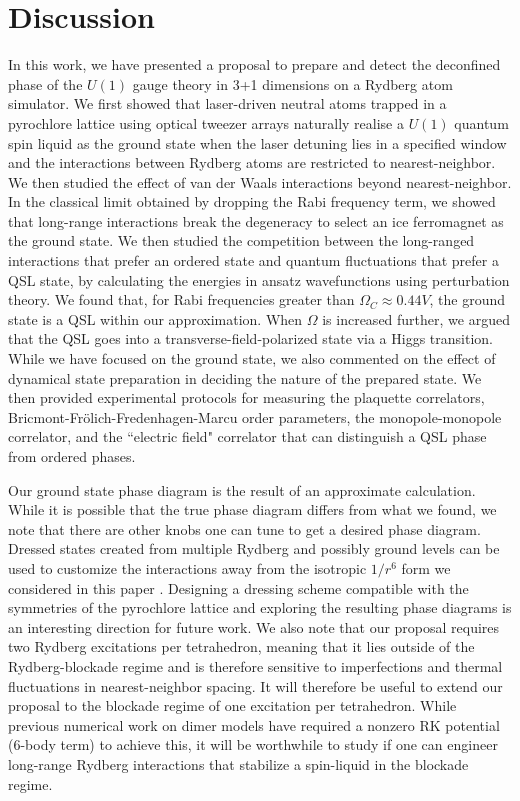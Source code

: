 \documentclass[twocolumn,superscriptaddress,amsmath,amssymb,aps,prx,nofootinbib]{revtex4-2}
\begin{document}
\section{Discussion}\label{sec:discussion}
In this work, we have presented a proposal to prepare and detect the deconfined phase of the $U(1)$ gauge theory in 3+1 dimensions on a Rydberg atom simulator. We first showed that laser-driven  neutral atoms trapped in a pyrochlore lattice using optical tweezer arrays naturally realise a $U(1)$ quantum spin liquid as the ground state when the laser detuning lies in a specified window and the interactions between Rydberg atoms are restricted to nearest-neighbor. We then studied the effect of van der Waals interactions beyond nearest-neighbor. In the classical limit obtained by dropping the Rabi frequency term, we showed that long-range interactions break the degeneracy to select an ice ferromagnet as the ground state. We then studied the competition between the long-ranged interactions that prefer an ordered state and quantum fluctuations that prefer a QSL state, by calculating the energies in ansatz wavefunctions using perturbation theory. We found that, for Rabi frequencies greater than $\Omega_C \approx 0.44 V$, the ground state is a QSL within our approximation. When $\Omega$ is increased further, we argued that the QSL goes into a transverse-field-polarized state via a Higgs transition. While we have focused on the ground state, we also commented on the effect of dynamical state preparation in deciding the nature of the prepared state. We then provided experimental protocols for measuring the plaquette correlators, Bricmont-Fr{\"o}lich-Fredenhagen-Marcu order parameters, the monopole-monopole correlator, and the ``electric field" correlator that can distinguish a QSL phase from ordered phases.

Our ground state phase diagram is the result of an approximate calculation. While it is possible that the true phase diagram differs from what we found, we note that there are other knobs one can tune to get a desired phase diagram. Dressed states created from multiple Rydberg and possibly ground levels can be used to customize the interactions away from the isotropic $1/r^6$ form we considered in this paper \cite{de2017Optical,glaetzle2015designing,van2015quantum,petrosyan2014binding,grass2018fractional,young2021asymmetric}. Designing a dressing scheme compatible with the symmetries of the pyrochlore lattice and exploring the resulting phase diagrams is an interesting direction for future work. We also note that our proposal requires two Rydberg excitations per tetrahedron, meaning that it lies outside of the Rydberg-blockade regime and is therefore sensitive to imperfections and thermal fluctuations in nearest-neighbor spacing. It will therefore be useful to extend our proposal to the blockade regime of one excitation per tetrahedron. While previous numerical work on dimer models have required a nonzero RK potential (6-body term) to achieve this, it will be worthwhile to study if one can engineer long-range Rydberg interactions that stabilize a spin-liquid in the blockade regime.
\end{document}
